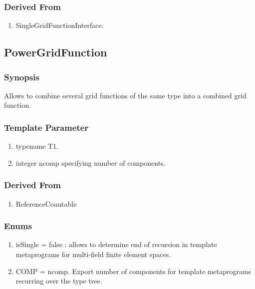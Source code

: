\documentclass[11pt,a4paper,DIV11,%
notitlepage,oneside,abstracton,%
bibtotoc]{scrartcl}
\begin{document}
\subsubsection{Derived From}

\begin{enumerate}[1)]
\item SingleGridFunctionInterface.
\end{enumerate}


\subsection{PowerGridFunction}

\subsubsection{Synopsis}

Allows to combine several grid functions of the same type into a
combined grid function.

\subsubsection{Template Parameter}

\begin{enumerate}[1)]
\item typename T1.
\item integer ncomp specifying number of components.
\end{enumerate}

\subsubsection{Derived From}

\begin{enumerate}[1)]
\item ReferenceCountable
\end{enumerate}

\subsubsection{Enums}

\begin{enumerate}[1)]
\item isSingle = false : allows to determine end of recursion in
  template metaprograms for multi-field finite element spaces.
\item COMP = ncomp. Export number of components for template
  metaprograms recurring over the type tree.
\end{enumerate}
\end{document}
